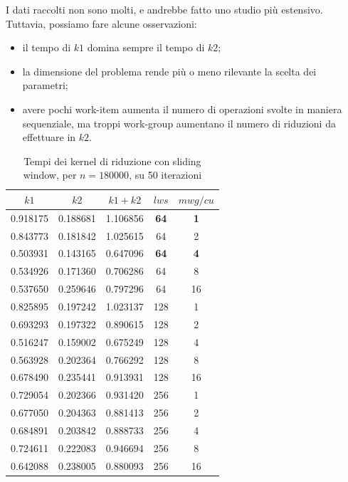 \documentclass{article}
\begin{document}
	I dati raccolti non sono molti, e andrebbe fatto uno studio più estensivo. Tuttavia, possiamo fare alcune osservazioni:
	\begin{itemize}
		\item il tempo di $k1$ domina sempre il tempo di $k2$;
		\item la dimensione del problema rende più o meno rilevante la scelta dei parametri;
		\item avere pochi work-item aumenta il numero di operazioni svolte in maniera sequenziale, ma troppi work-group aumentano il numero di riduzioni da effettuare in $k2$.
	\end{itemize}
	\begin{table}[h]
		\centering
		\begin{tabular}{c|c|c|c|c}
		$k1$ & $k2$ & $k1 + k2$ & $lws$ & $mwg/cu$\\
		\hline
		0.918175 & 0.188681 & 1.106856 &  \textbf{64} &  \textbf{1} \\
		0.843773 & 0.181842 & 1.025615 &  64 &  2 \\
		0.503931 & 0.143165 & 0.647096 &  \textbf{64} &  \textbf{4} \\
		0.534926 & 0.171360 & 0.706286 &  64 &  8 \\
		0.537650 & 0.259646 & 0.797296 &  64 & 16 \\
		0.825895 & 0.197242 & 1.023137 & 128 &  1 \\
		0.693293 & 0.197322 & 0.890615 & 128 &  2 \\
		0.516247 & 0.159002 & 0.675249 & 128 &  4 \\
		0.563928 & 0.202364 & 0.766292 & 128 &  8 \\
		0.678490 & 0.235441 & 0.913931 & 128 & 16 \\
		0.729054 & 0.202366 & 0.931420 & 256 &  1 \\
		0.677050 & 0.204363 & 0.881413 & 256 &  2 \\
		0.684891 & 0.203842 & 0.888733 & 256 &  4 \\
		0.724611 & 0.222083 & 0.946694 & 256 &  8 \\
		0.642088 & 0.238005 & 0.880093 & 256 & 16 \\
		\end{tabular}
		\label{tab:1}
		\caption{Tempi dei kernel di riduzione con sliding window, per $n = 180000$, su 50 iterazioni}
	\end{table}
	
\end{document}
